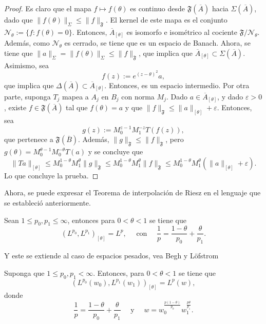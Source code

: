 \begin{proof}
	Es claro que el mapa $f\mapsto f(\theta)$ es continuo desde $\mathfrak{F}(\overline{A})$ hacia $\Sigma(\overline{A})$, dado que $\|f(\theta)\|_{\Sigma} \leq \|f\|_{\mathfrak{F}}$. El kernel de este mapa es el conjunto $\mathcal{N}_\theta:=\{f: f(\theta)=0\}$. Entonces, $\overline{A}_{[\theta]}$ es isomorfo e isométrico al cociente $\mathfrak{F}/\mathcal{N}_\theta$. Además, como $\mathcal{N}_\theta$ es cerrado, se tiene que es un espacio de Banach. Ahora, se tiene que $\|a\|_\Sigma = \|f(\theta)\|_\Sigma \leq \|f\|_{\mathfrak{F}}$, que implica que $\overline{A}_{[\theta]} \subset \Sigma(\overline{A})$. Asimismo, sea 
	\begin{equation*}
		f(z) := e^{(z-\theta)^2}a,
	\end{equation*}
	que implica que $\Delta(\overline{A})\subset \overline{A}_{[\theta]}$. Entonces, es un espacio intermedio. Por otra parte, suponga $T_j$ mapea a $A_j$ en $B_j$ con norma $M_j$. Dado $a\in\overline{A}_{[\theta]}$, y dado $\varepsilon>0$, existe $f\in\mathfrak{F}(\overline{A})$ tal que $f(\theta)=a$ y que $\|f\|_{\mathfrak{F}}\leq \|a\|_{[\theta]}+\varepsilon$. Entonces, sea 
	\begin{equation*}
		g(z) := M_0^{z-1}M_1^{-z}T(f(z)),
	\end{equation*}
	que pertenece a $\mathfrak{F}(\overline{B})$. Además, $\|g\|_{\mathfrak{F}} \leq \|f\|_{\mathfrak{F}}$, pero $g(\theta)=M_0^{\theta-1}M_0^{-\theta} T(a)$ y se concluye que 
	\begin{equation*}
		\|Ta\|_{[\theta]} \leq M_0^{1-\theta}M_1^\theta \|g\|_{\mathfrak{F}} \leq M_0^{1-\theta}M_1^\theta \|f\|_{\mathfrak{F}} \leq M_0^{1-\theta}M_1^\theta (\|a\|_{[\theta]} + \varepsilon) .
	\end{equation*}
	Lo que concluye la prueba.
\end{proof}
Ahora, se puede expresar el Teorema de interpolación de Riesz en el lenguaje que se estableció anteriormente. 
\begin{theorem}
	Sean $1\leq p_0,p_1\leq \infty$, entonces para $0<\theta<1$ se tiene que 
	\begin{equation*}
		(L^{p_0}, L^{p_1})_{[\theta]} = L^p, \quad \text{ con } \quad \frac{1}{p} = \frac{1-\theta}{p_0} + \frac{\theta}{p_1}.
	\end{equation*}
\end{theorem}
Y este se extiende al caso de espacios pesados, vea Begh y Löfstrom \cite{bergh-lofstrom}
\begin{theorem}
	Suponga que $1\leq p_0,p_1<\infty$. Entonces, para $0<\theta<1$ se tiene que 
	\begin{equation*}
		(L^{p_0}(w_0), L^{p_1}(w_1))_{[\theta]} = L^p(w),
	\end{equation*}
	donde 
	\begin{equation*}
		\frac{1}{p} = \frac{1-\theta}{p_0} + \frac{\theta}{p_1} \quad \text{ y } \quad w = w_0^{\frac{p(1-\theta)}{p_0}} w_1^{\frac{p\theta}{p_1}}.
	\end{equation*}
	\label{theo:interpolation-Lpw}
\end{theorem}
